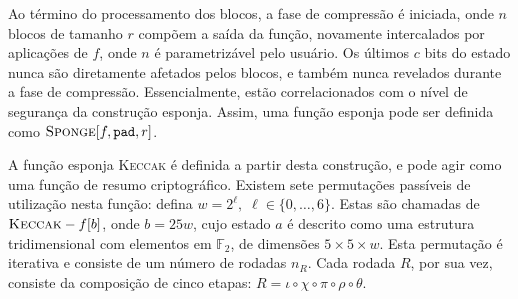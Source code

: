 \documentclass[12pt]{report}
\begin{document}

Ao término do processamento dos blocos, a fase de compressão é iniciada, onde
$n$ blocos de tamanho $r$ compõem a saída da função, novamente intercalados por
aplicações de $f$, onde $n$ é parametrizável pelo usuário. Os últimos $c$ bits
do estado nunca são diretamente afetados pelos blocos, e também nunca revelados
durante a fase de compressão. Essencialmente, estão correlacionados com o nível
de segurança da construção esponja. Assim, uma função esponja pode ser definida
como $\textsc{Sponge}[f, \texttt{pad}, r]$.

A função esponja \textsc{Keccak} \cite{KeccakReference} é definida a partir
desta construção, e pode agir como uma função de resumo criptográfico. Existem
sete permutações passíveis de utilização nesta função: defina $w = 2^{\ell}, \;
\ell \in \{0, \dots, 6\}$.  Estas são chamadas de $\textsc{Keccak}-f[b]$, onde
$b = 25w$, cujo estado $a$ é descrito como uma estrutura tridimensional com
elementos em $\mathbb{F}_2$, de dimensões $5 \times 5 \times w$. Esta
permutação é iterativa e consiste de um número de rodadas $n_R$. Cada rodada
$R$, por sua vez, consiste da composição de cinco etapas: $R = \iota \circ \chi
\circ \pi \circ \rho \circ \theta$.
\end{document}
